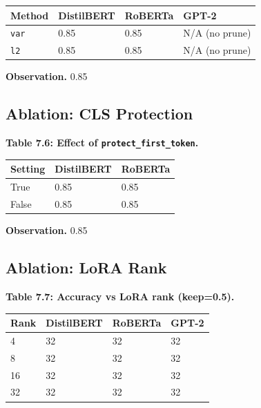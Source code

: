 \begin{table}[H]
\centering
\small
\begin{tabular}{llll}
\toprule
\textbf{Method} & \textbf{DistilBERT} & \textbf{RoBERTa} & \textbf{GPT-2} \\
\midrule
\texttt{var} & 0.85 & 0.85 & N/A (no prune) \\
\texttt{l2} & 0.85 & 0.85 & N/A (no prune) \\
\bottomrule
\end{tabular}
\end{table}

\textbf{Observation.} 0.85

\subsection{Ablation: CLS Protection}

\textbf{Table 7.6: Effect of \texttt{protect\_first\_token}.}

\begin{table}[H]
\centering
\small
\begin{tabular}{lll}
\toprule
\textbf{Setting} & \textbf{DistilBERT} & \textbf{RoBERTa} \\
\midrule
True & 0.85 & 0.85 \\
False & 0.85 & 0.85 \\
\bottomrule
\end{tabular}
\end{table}

\textbf{Observation.} 0.85

\subsection{Ablation: LoRA Rank}

\textbf{Table 7.7: Accuracy vs LoRA rank (keep=0.5).}

\begin{table}[H]
\centering
\small
\begin{tabular}{llll}
\toprule
\textbf{Rank} & \textbf{DistilBERT} & \textbf{RoBERTa} & \textbf{GPT-2} \\
\midrule
4 & 32 & 32 & 32 \\
8 & 32 & 32 & 32 \\
16 & 32 & 32 & 32 \\
32 & 32 & 32 & 32 \\
\bottomrule
\end{tabular}
\end{table}

